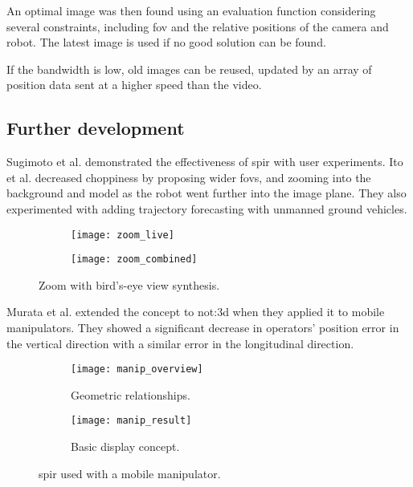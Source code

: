   An optimal image was then found using an evaluation function considering several constraints, including \gls{fov} and the relative positions of the camera and robot.
  The latest image is used if no good solution can be found.

  If the bandwidth is low, old images can be reused, updated by an array of position data sent at a higher speed than the video.

  \subsection{Further development}
    Sugimoto et al. demonstrated the effectiveness of \gls{spir} with user experiments.\cite{sugimoto2005}
    Ito et al. decreased choppiness by proposing wider \glspl{fov}, and zooming into the background and model as the robot went further into the image plane.\cite{ito2008}
    They also experimented with adding trajectory forecasting with unmanned ground vehicles.

    \begin{figure}[h]
      \centering
      \begin{subfigure}[b]{0.45\textwidth}
	\texttt{[image: zoom\_live]}
      \end{subfigure}
      \hfill
      \begin{subfigure}[b]{0.45\textwidth}
	\texttt{[image: zoom\_combined]}
      \end{subfigure}
      \caption[\acrshort{spir} with zoom]{Zoom with bird's-eye view synthesis.\cite{ito2008}}
      \label{fig:zoom_results}
    \end{figure}

    Murata et al. extended the concept to \gls{not:3d} when they applied it to mobile manipulators.\cite{murata2014}
    They showed a significant decrease in operators' position error in the vertical direction with a similar error in the longitudinal direction.

    \begin{figure}[h]
      \centering
      \begin{subfigure}[b]{0.45\textwidth}
	\texttt{[image: manip\_overview]}
	\caption{Geometric relationships.}
      \end{subfigure}
      \hfill
      \begin{subfigure}[b]{0.45\textwidth}
	\texttt{[image: manip\_result]}
	\caption{Basic display concept.}
      \end{subfigure}
      \caption[\acrshort{spir} with mobile manipulator]{\gls{spir} used with a mobile manipulator.\cite{murata2014}}
      \label{fig:manip_results}
    \end{figure}

